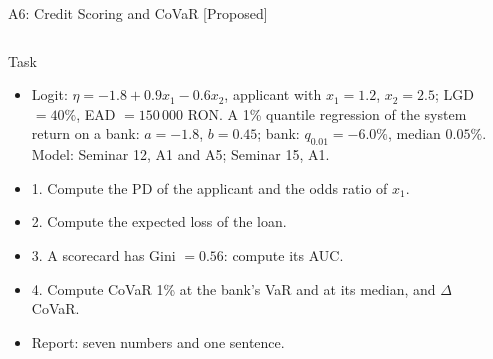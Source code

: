 \begin{frame}{A6: Credit Scoring and CoVaR [Proposed]}
\propsub
\itemsize{\scriptsize}
\begin{columns}[T]
\begin{column}{\taskw}
\begin{block}{Task}
\begin{itemize}
    \item Logit: $\eta = -1.8 + 0.9x_1 - 0.6x_2$, applicant with $x_1 = 1.2$, $x_2 = 2.5$; LGD $= 40\%$, EAD $= 150\,000$ RON. A 1\% quantile regression of the system return on a bank: $a = -1.8$, $b = 0.45$; bank: $q_{0.01} = -6.0\%$, median $0.05\%$. Model: Seminar 12, A1 and A5; Seminar 15, A1.
    \item 1. Compute the PD of the applicant and the odds ratio of $x_1$.
    \item 2. Compute the expected loss of the loan.
    \item 3. A scorecard has Gini $= 0.56$: compute its AUC.
    \item 4. Compute CoVaR 1\% at the bank's VaR and at its median, and $\Delta$CoVaR.
    \item Report: seven numbers and one sentence.
\end{itemize}
\end{block}
\end{column}
\begin{column}{\solw}
\end{column}
\end{columns}
\end{frame}


